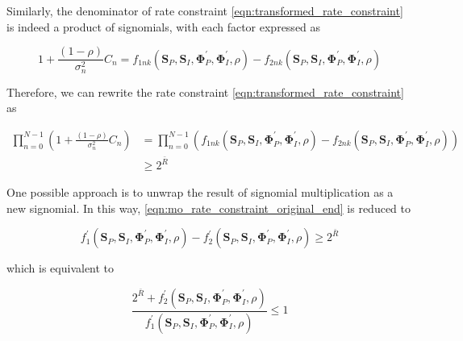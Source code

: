 Similarly, the denominator of rate constraint \eqref{eqn:transformed_rate_constraint} is indeed a product of signomials, with each factor expressed as

\begin{equation}\label{eqn:mo_rate_signomial}
  1 + \frac{{(1 - \rho )}}{{\sigma _n^2}}{C_n} = {f_{1nk}}\left( {{{\mathbf{S}}_P},{{\mathbf{S}}_I},{\mathbf{\Phi }}_P^\prime ,{\mathbf{\Phi }}_I^\prime ,\rho } \right) - {f_{2nk}}\left( {{{\mathbf{S}}_P},{{\mathbf{S}}_I},{\mathbf{\Phi }}_P^\prime ,{\mathbf{\Phi }}_I^\prime ,\rho } \right)
\end{equation}

Therefore, we can rewrite the rate constraint \eqref{eqn:transformed_rate_constraint} as

\begin{align}\label{eqn:mo_rate_constraint_original}
  \prod\limits_{n = 0}^{N - 1} {\left( {1 + \frac{{(1 - \rho )}}{{\sigma _n^2}}{C_n}} \right)}  &= \prod\limits_{n = 0}^{N - 1} {\left( {{f_{1nk}}\left( {{{\mathbf{S}}_P},{{\mathbf{S}}_I},{\mathbf{\Phi }}_P^\prime ,{\mathbf{\Phi }}_I^\prime ,\rho } \right) - {f_{2nk}}\left( {{{\mathbf{S}}_P},{{\mathbf{S}}_I},{\mathbf{\Phi }}_P^\prime ,{\mathbf{\Phi }}_I^\prime ,\rho } \right)} \right)}  \\
  &\geqslant {2^{\bar R}} \label{eqn:mo_rate_constraint_original_end}
\end{align}

One possible approach is to unwrap the result of signomial multiplication as a new signomial. In this way, \eqref{eqn:mo_rate_constraint_original_end} is reduced to

\begin{equation}\label{eqn:mo_rate_constraint_unwrapped}
  f_1^\prime \left( {{{\mathbf{S}}_P},{{\mathbf{S}}_I},{\mathbf{\Phi }}_P^\prime ,{\mathbf{\Phi }}_I^\prime ,\rho } \right) - f_2^\prime \left( {{{\mathbf{S}}_P},{{\mathbf{S}}_I},{\mathbf{\Phi }}_P^\prime ,{\mathbf{\Phi }}_I^\prime ,\rho } \right) \geqslant {2^{\bar R}}
\end{equation}

which is equivalent to

\begin{equation}\label{eqn:mo_rate_constraint_rewritten}
  \frac{{{2^{\bar R}} + f_2^\prime \left( {{{\mathbf{S}}_P},{{\mathbf{S}}_I},{\mathbf{\Phi }}_P^\prime ,{\mathbf{\Phi }}_I^\prime ,\rho } \right)}}{{f_1^\prime \left( {{{\mathbf{S}}_P},{{\mathbf{S}}_I},{\mathbf{\Phi }}_P^\prime ,{\mathbf{\Phi }}_I^\prime ,\rho } \right)}} \leqslant 1
\end{equation}

